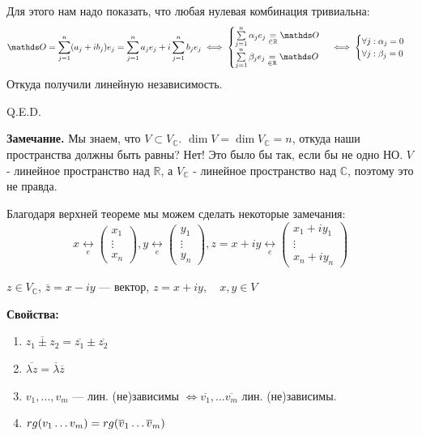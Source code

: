 Для этого нам надо показать, что любая нулевая комбинация тривиальна:
$$\zero = \sum\limits_{j=1}^n(a_j+ib_j)e_j = \sum\limits_{j=1}^na_je_j + i\sum\limits_{j=1}^nb_je_j \iff \begin{cases}
    \sum\limits_{j=1}^n \alpha_je_j\underset{\in \mathbb{R}} = \zero \\
     \sum\limits_{j=1}^n \beta_je_j\underset{\in \mathbb{R}} =\zero
\end{cases} \iff  \begin{cases}
     \forall j : \alpha_j =0 \\
    \forall j : \beta_j =0
\end{cases}$$
Откуда получили линейную независимость.

\hfill Q.E.D.

\textbf{Замечание.} Мы знаем, что $V \subset V_{\mathbb{C}}$. $\dim V = \dim V_{\mathbb{C}} = n$, откуда наши пространства должны быть равны? Нет! Это было бы так, если бы не одно НО.  $V$ - линейное пространство над $\mathbb{R}$, а $V_{\mathbb{C}}$ - линейное пространство над $\mathbb{C}$, поэтому это не правда.


Благодаря верхней теореме мы можем сделать некоторые замечания:
$$x \underset{e} \leftrightarrow \begin{pmatrix}
    x_1\\
    \vdots \\
    x_n
\end{pmatrix},y \underset{e} \leftrightarrow \begin{pmatrix}
    y_1\\
    \vdots \\
    y_n
\end{pmatrix}, z=x+iy \underset{e} \leftrightarrow \begin{pmatrix}
    x_1 +iy_1\\
    \vdots \\
    x_n+iy_n
\end{pmatrix}$$


 $z \in V_{\mathbb{C}}$, $\overline{z}=x-iy$ ---  вектор, $z=x+iy, \quad x,y \in V$

\textbf{Свойства:}
\begin{enumerate}
    \item $\overline{z_1 \pm z_2} = \overline{z_1}  \pm \overline{z_2}$
    \item $\overline{\lambda z} = \overline{\lambda} \overline{z}$
    \item$v_1,\ldots,v_m$ --- лин. (не)зависимы $\Leftrightarrow \overline{v_1}, \ldots \overline{v_m}$ лин. (не)зависимы.
    \item $rg (v_1\dots v_m) = rg (\overline{v}_1\dots \overline{v}_m)$
\end{enumerate}

